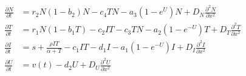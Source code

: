 \documentclass[11pt]{amsart}
\begin{document}
\begin{itemize}
		\begin{eqnarray}
			\begin{aligned}
				\frac{\partial N}{\partial t} &= r_2 N (1-b_2)N - c_4TN - a_3(1-e^U)N + D_N \frac{\partial^2 N }{\partial x^2} \\
				\frac{\partial T}{\partial t} &= r_1 N (1-b_1 T) - c_2 IT - c_3TN - a_2(1-e^{-U})T + D_T \frac{\partial^2 T }{\partial x^2} \\
				\frac{\partial I}{\partial t} &= s + \frac{\rho IT}{\alpha + T} - c_1 IT - d_1 I - a_1(1-e^{-U})I +D_I \frac{\partial^2 I }{\partial x^2} \\
				\frac{\partial U}{\partial t} &= v(t) -d_2U + D_U \frac{\partial^2 U}{\partial x^2}\label{eq:GrowthChemoImmunoPDE}
			\end{aligned}
		\end{eqnarray}
\end{itemize}


\newpage

\end{document}
